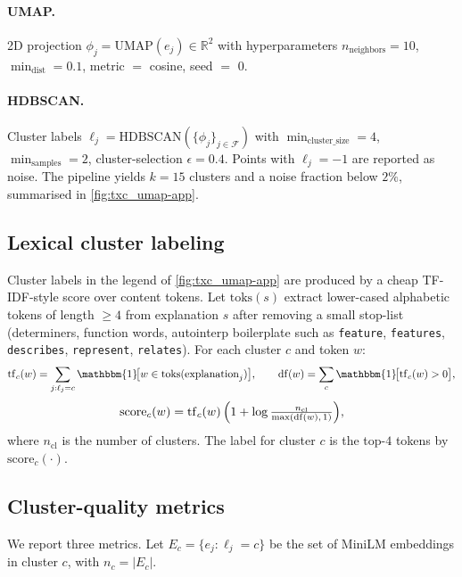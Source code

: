 \paragraph{UMAP.} 2D projection $\phi_j = \mathrm{UMAP}(e_j) \in \mathbb{R}^2$ with hyperparameters $n_{\text{neighbors}}{=}10$, $\min_{\text{dist}}{=}0.1$, metric $=$ cosine, seed $=$ 0.

\paragraph{HDBSCAN.} Cluster labels $\ell_j = \mathrm{HDBSCAN}(\{\phi_j\}_{j\in\mathcal{F}})$ with $\min_{\text{cluster\_size}}{=}4$, $\min_{\text{samples}}{=}2$, cluster-selection $\epsilon = 0.4$. Points with $\ell_j = -1$ are reported as noise. The pipeline yields $k{=}15$ clusters and a noise fraction below $2\%$, summarised in \cref{fig:txc_umap-app}.

\subsection{Lexical cluster labeling}
\label{app:meta-label}
Cluster labels in the legend of \cref{fig:txc_umap-app} are produced by a cheap TF-IDF-style score over content tokens. Let $\mathrm{toks}(s)$ extract lower-cased alphabetic tokens of length $\geq 4$ from explanation $s$ after removing a small stop-list (determiners, function words, autointerp boilerplate such as \texttt{feature}, \texttt{features}, \texttt{describes}, \texttt{represent}, \texttt{relates}). For each cluster $c$ and token $w$:
\begin{equation}
    \mathrm{tf}_c(w) = \sum_{j:\ell_j=c} \mathbbm{1}\!\bigl[w \in \mathrm{toks}(\text{explanation}_j)\bigr],
    \qquad
    \mathrm{df}(w)   = \sum_{c} \mathbbm{1}\!\bigl[\mathrm{tf}_c(w) > 0\bigr],
\end{equation}
\begin{equation}
    \mathrm{score}_c(w) = \mathrm{tf}_c(w)\,\Bigl(1 + \log\tfrac{n_{\text{cl}}}{\max(\mathrm{df}(w),\,1)}\Bigr),
\end{equation}
where $n_{\text{cl}}$ is the number of clusters. The label for cluster $c$ is the top-$4$ tokens by $\mathrm{score}_c(\cdot)$.

\subsection{Cluster-quality metrics}
\label{app:meta-metrics}
We report three metrics. Let $E_c = \{e_j : \ell_j = c\}$ be the set of MiniLM embeddings in cluster $c$, with $n_c = |E_c|$.

